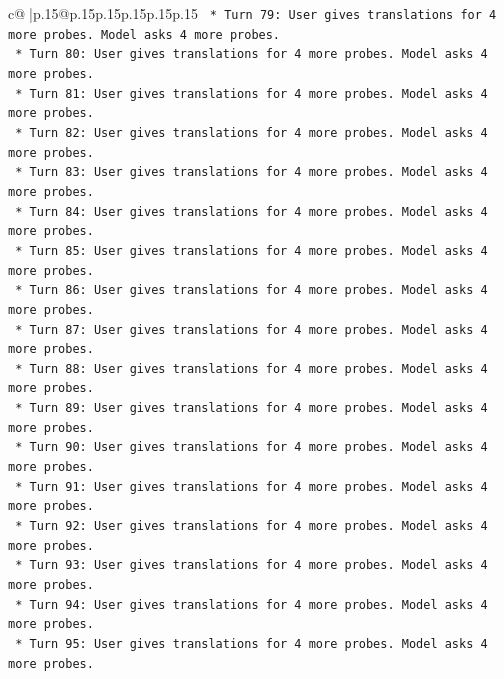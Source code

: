 \documentclass{article}
\begin{document}
{\begin{supertabular}{c@{$\;$}|p{.15\linewidth}@{}p{.15\linewidth}p{.15\linewidth}p{.15\linewidth}p{.15\linewidth}p{.15\linewidth}}
{{{\texttt{                    *   Turn 79: User gives translations for 4 more probes. Model asks 4 more probes.} \\
\texttt{                    *   Turn 80: User gives translations for 4 more probes. Model asks 4 more probes.} \\
\texttt{                    *   Turn 81: User gives translations for 4 more probes. Model asks 4 more probes.} \\
\texttt{                    *   Turn 82: User gives translations for 4 more probes. Model asks 4 more probes.} \\
\texttt{                    *   Turn 83: User gives translations for 4 more probes. Model asks 4 more probes.} \\
\texttt{                    *   Turn 84: User gives translations for 4 more probes. Model asks 4 more probes.} \\
\texttt{                    *   Turn 85: User gives translations for 4 more probes. Model asks 4 more probes.} \\
\texttt{                    *   Turn 86: User gives translations for 4 more probes. Model asks 4 more probes.} \\
\texttt{                    *   Turn 87: User gives translations for 4 more probes. Model asks 4 more probes.} \\
\texttt{                    *   Turn 88: User gives translations for 4 more probes. Model asks 4 more probes.} \\
\texttt{                    *   Turn 89: User gives translations for 4 more probes. Model asks 4 more probes.} \\
\texttt{                    *   Turn 90: User gives translations for 4 more probes. Model asks 4 more probes.} \\
\texttt{                    *   Turn 91: User gives translations for 4 more probes. Model asks 4 more probes.} \\
\texttt{                    *   Turn 92: User gives translations for 4 more probes. Model asks 4 more probes.} \\
\texttt{                    *   Turn 93: User gives translations for 4 more probes. Model asks 4 more probes.} \\
\texttt{                    *   Turn 94: User gives translations for 4 more probes. Model asks 4 more probes.} \\
\texttt{                    *   Turn 95: User gives translations for 4 more probes. Model asks 4 more probes.} \\
}}}
\end{supertabular}}
\end{document}
